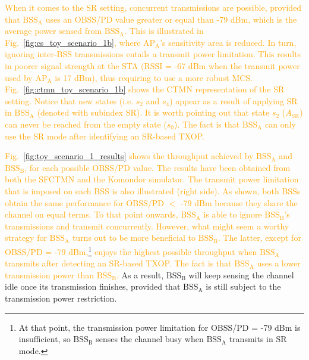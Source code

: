 \documentclass{ieeeaccess}
\begin{document}
\textcolor{orange}{When it comes to the SR setting, concurrent transmissions are possible, provided that $\text{BSS}_\text{A}$ uses an OBSS/PD value greater or equal than -79 dBm, which is the average power sensed from $\text{BSS}_\text{A}$. This is illustrated in Fig.~\ref{fig:cs_toy_scenario_1b}, where $\text{AP}_\text{A}$'s sensitivity area is reduced. In turn, ignoring inter-BSS transmissions entails a transmit power limitation. This results in poorer signal strength at the STA (RSSI = -67 dBm when the transmit power used by AP$_\text{A}$ is 17 dBm), thus requiring to use a more robust MCS. Fig.~\ref{fig:ctmn_toy_scenario_1b} shows the CTMN representation of the SR setting. Notice that new states (i.e. $s_2$ and $s_4$) appear as a result of applying SR in $\text{BSS}_\text{A}$ (denoted with subindex $\text{SR}$). It is worth pointing out that state $s_2$ ($A_\text{SR}$) can never be reached from the empty state ($s_0$). The fact is that $\text{BSS}_\text{A}$ can only use the SR mode after identifying an SR-based TXOP.}

\textcolor{orange}{Fig.~\ref{fig:toy_scenario_1_results} shows the throughput achieved by $\text{BSS}_\text{A}$ and $\text{BSS}_\text{B}$, for each possible OBSS/PD value. The results have been obtained from both the SFCTMN and the Komondor simulator. The transmit power limitation that is imposed on each BSS is also illustrated (right side). As shown, both BSSs obtain the same performance for OBSS/PD $<$ -79 dBm because they share the channel on equal terms. To that point onwards, $\text{BSS}_\text{A}$ is able to ignore $\text{BSS}_\text{B}$'s transmissions and transmit concurrently. However, what might seem a worthy strategy for $\text{BSS}_\text{A}$ turns out to be more beneficial to $\text{BSS}_\text{B}$. The latter, except for OBSS/PD = -79 dBm,\footnote{At that point, the transmission power limitation for OBSS/PD = -79 dBm is insufficient, so $\text{BSS}_\text{B}$ senses the channel busy when $\text{BSS}_\text{A}$ transmits in SR mode.} enjoys the highest possible throughput when $\text{BSS}_\text{A}$ transmits after detecting an SR-based TXOP. The fact is that $\text{BSS}_\text{A}$ uses a lower transmission power than $\text{BSS}_\text{B}$.} As a result, $\text{BSS}_\text{B}$ will keep sensing the channel idle once its transmission finishes, provided that $\text{BSS}_\text{A}$ is still subject to the transmission power restriction.
\end{document}
